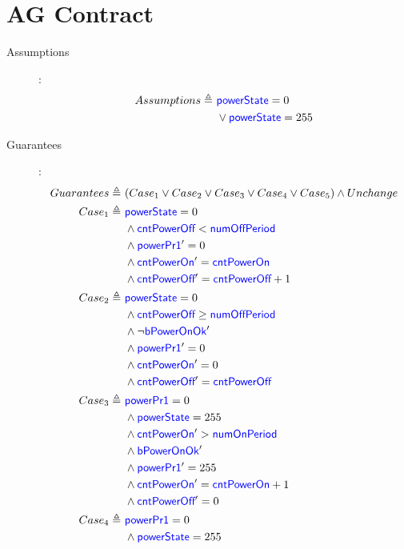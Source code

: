 \documentclass[fleqn,a4paper]{article}
\newcommand\Var[1]{\textcolor{blue}{\textsf{#1}}}
\newcommand\definedby{\triangleq}
\begin{document}
\newpage

\section{AG Contract}

\begin{description}

\item[Assumptions]:
\begin{align*}
Assumptions \definedby \
& \Var{powerState}=0 \\
& \vee \Var{powerState} = 255
\end{align*}

\item[Guarantees]:
\begin{align*}
Guarantees \definedby \
& (Case_1 \vee Case_2 \vee Case_3 \vee Case_4 \vee Case_5) \wedge Unchange \\
Case_1 \definedby \
& \Var{powerState} = 0 \\
& \wedge \Var{cntPowerOff} < \Var{numOffPeriod} \\
& \wedge \Var{powerPr1}' = 0 \\
& \wedge \Var{cntPowerOn}' = \Var{cntPowerOn} \\
& \wedge \Var{cntPowerOff}' = \Var{cntPowerOff} + 1 \\
Case_2 \definedby \
& \Var{powerState} = 0 \\
& \wedge \Var{cntPowerOff} \geq \Var{numOffPeriod} \\
& \wedge \neg \Var{bPowerOnOk}' \\
& \wedge \Var{powerPr1}' = 0 \\
& \wedge \Var{cntPowerOn}' = 0 \\
& \wedge \Var{cntPowerOff}' = \Var{cntPowerOff} \\
Case_3 \definedby \
& \Var{powerPr1} = 0 \\
& \wedge \Var{powerState} = 255 \\
& \wedge \Var{cntPowerOn}' > \Var{numOnPeriod} \\
& \wedge \Var{bPowerOnOk}' \\
& \wedge \Var{powerPr1}' = 255 \\
& \wedge \Var{cntPowerOn}' = \Var{cntPowerOn} + 1 \\
& \wedge \Var{cntPowerOff}' = 0 \\
Case_4 \definedby \
& \Var{powerPr1}=0 \\
& \wedge \Var{powerState} = 255 \\

\end{align*}
\end{description}
\end{document}
